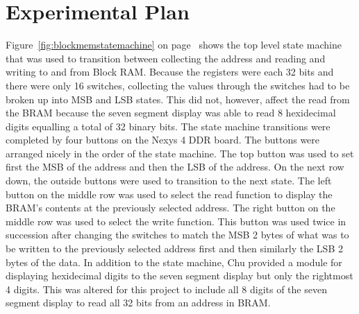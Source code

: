 \documentclass{article}
\begin{document}
\section{Experimental Plan}
Figure~\ref{fig:blockmemstatemachine} on page~\pageref{fig:blockmemstatemachine} shows the top level state machine that was used to transition between collecting the address and reading and writing to and from Block RAM. Because the registers were each 32 bits and there were only 16 switches, collecting the values through the switches had to be broken up into MSB and LSB states. This did not, however, affect the read from the BRAM because the seven segment display was able to read 8 hexidecimal digits equalling a total of 32 binary bits. The state machine transitions were completed by four buttons on the Nexys 4 DDR board. The buttons were arranged nicely in the order of the state machine. The top button was used to set first the MSB of the address and then the LSB of the address. On the next row down, the outside buttons were used to transition to the next state. The left button on the middle row was used to select the read function to display the BRAM's contents at the previously selected address. The right button on the middle row was used to select the write function. This button was used twice in succession after changing the switches to match the MSB 2 bytes of what was to be written to the previously selected address first and then similarly the LSB 2 bytes of the data. In addition to the state machine, Chu provided a module for displaying hexidecimal digits to the seven segment display but only the rightmost 4 digits. This was altered for this project to include all 8 digits of the seven segment display to read all 32 bits from an address in BRAM.
\end{document}
